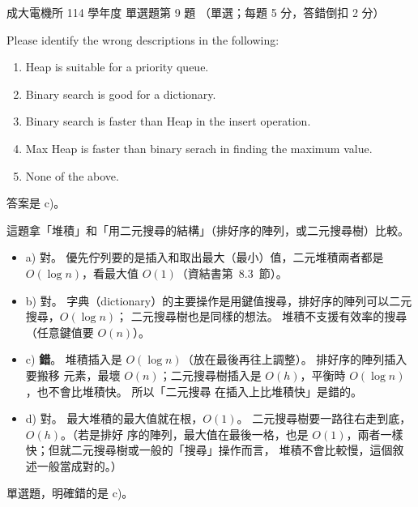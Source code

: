 \begin{pastexam}[label={px:ncku-114-ee-ds-09}]{成大電機所 114 學年度 單選題第 9 題}
（單選；每題 5 分，答錯倒扣 2 分）

Please identify the wrong descriptions in the following:
\begin{enumerate}[label=\alph*)]
\item Heap is suitable for a priority queue.
\item Binary search is good for a dictionary.
\item Binary search is faster than Heap in the insert operation.
\item Max Heap is faster than binary serach in finding the maximum value.
\item None of the above.
\end{enumerate}
\end{pastexam}

\begin{pastsoln}
答案是 c)。

這題拿「堆積」和「用二元搜尋的結構」（排好序的陣列，或二元搜尋樹）比較。
\begin{itemize}
\item a) 對。 優先佇列要的是插入和取出最大（最小）值，二元堆積兩者都是 $O(\log n)$，看最大值
$O(1)$（資結書第~8.3~節）。
\item b) 對。 字典（dictionary）的主要操作是用鍵值搜尋，排好序的陣列可以二元搜尋，$O(\log n)$；
二元搜尋樹也是同樣的想法。 堆積不支援有效率的搜尋（任意鍵值要 $O(n)$）。
\item c) \textbf{錯}。 堆積插入是 $O(\log n)$（放在最後再往上調整）。 排好序的陣列插入要搬移
元素，最壞 $O(n)$；二元搜尋樹插入是 $O(h)$，平衡時 $O(\log n)$，也不會比堆積快。 所以「二元搜尋
在插入上比堆積快」是錯的。
\item d) 對。 最大堆積的最大值就在根，$O(1)$。 二元搜尋樹要一路往右走到底，$O(h)$。（若是排好
序的陣列，最大值在最後一格，也是 $O(1)$，兩者一樣快；但就二元搜尋樹或一般的「搜尋」操作而言，
堆積不會比較慢，這個敘述一般當成對的。）
\end{itemize}
單選題，明確錯的是 c)。
\end{pastsoln}
